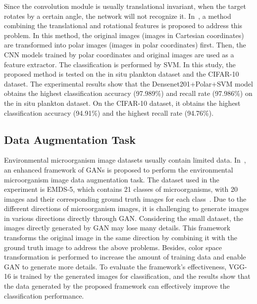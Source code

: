 Since the convolution module is usually translational invariant, when the target rotates by a certain angle, the network will not recognize it. In~\cite{Cheng-2020-MTCN}, a method combining the translational and rotational features is proposed to address this problem. In this method, the original images (images in Cartesian coordinates) are transformed into polar images (images in polar coordinates) first. Then, the CNN models trained by polar coordinates and original images are used as a feature extractor. The classification is performed by SVM. In this study, the proposed method is tested on the in situ plankton dataset and the CIFAR-10 dataset. The experimental results show that the Densenet201+Polar+SVM model obtains the highest classification accuracy (97.989\%) and recall rate (97.986\%) on the in situ plankton dataset. On the CIFAR-10 dataset, it obtains the highest classification accuracy (94.91\%) and the highest recall rate (94.76\%).





\subsection{Data Augmentation Task}



Environmental microorganism image datasets usually contain limited data. In~\cite{Xu-2020-AEFG}, an enhanced framework of GANs is proposed to perform the environmental microorganism image data augmentation task. The dataset used in the experiment is EMDS-5, which contains 21 classes of microorganisms, with 20 images and their corresponding ground truth images for each class~\cite{Li-2021-EMDS}. Due to the different directions of microorganism images, it is challenging to generate images in various directions directly through GAN. Considering the small dataset, the images directly generated by GAN may lose many details. This framework transforms the original image in the same direction by combining it with the ground truth image to address the above problems. Besides, color space transformation is performed to increase the amount of training data and enable GAN to generate more details. To evaluate the framework's effectiveness, VGG-16 is trained by the generated images for classification, and the results show that the data generated by the proposed framework can effectively improve the classification performance. 




